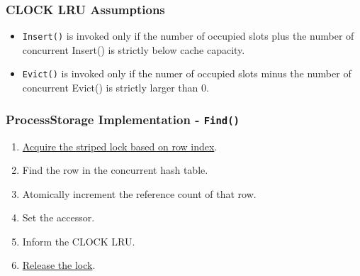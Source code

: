 \documentclass{beamer}
\begin{document}
\begin{frame}
\frametitle{CLOCK LRU Assumptions}
\begin{itemize}
\item \texttt{Insert()} is invoked only if the number of occupied slots plus the 
  number of concurrent Insert() is strictly below cache capacity.
\item \texttt{Evict()} is invoked only if the numer of occupied slots minus the 
  number of concurrent Evict() is strictly larger than 0.
\end{itemize}
\end{frame}

\begin{frame}
\frametitle{ProcessStorage Implementation - \texttt{Find()}}
\begin{enumerate}
\item \underline{Acquire the striped lock based on row index}.
\item Find the row in the concurrent hash table.
\item Atomically increment the reference count of that row.
\item Set the accessor.
\item Inform the CLOCK LRU.
\item \underline{Release the lock}.
\end{enumerate}
\end{frame}
\end{document}
